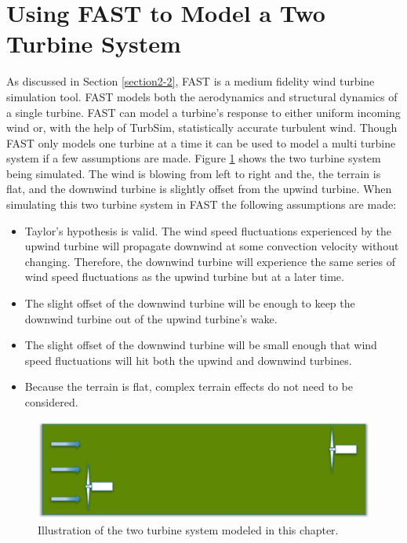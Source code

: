 
\section{Using FAST to Model a Two Turbine System} \label{section3-2}

As discussed in Section \ref{section2-2}, FAST is a medium fidelity wind turbine simulation tool. FAST models both the aerodynamics and structural dynamics of a single turbine. FAST can model a turbine's response to either uniform incoming wind or, with the help of TurbSim, statistically accurate turbulent wind. Though FAST only models one turbine at a time it can be used to model a multi turbine system if a few assumptions are made. Figure \ref{fig3-5} shows the two turbine system being simulated. The wind is blowing from left to right and the, the terrain is flat, and the downwind turbine is slightly offset from the upwind turbine. When simulating this two turbine system in FAST the following assumptions are made:

\begin{itemize}
  \item Taylor's hypothesis is valid. The wind speed fluctuations experienced by the upwind turbine will propagate downwind at some convection velocity without changing. Therefore, the downwind turbine will experience the same series of wind speed fluctuations as the upwind turbine but at a later time.
  \item The slight offset of the downwind turbine will be enough to keep the downwind turbine out of the upwind turbine's wake.
  \item The slight offset of the downwind turbine will be small enough that wind speed fluctuations will hit both the upwind and downwind turbines.
  \item Because the terrain is flat, complex terrain effects do not need to be considered.
\end{itemize}


 \begin{figure}[htbp]
	\centering
		\includegraphics[width=\linewidth]{Figures/ch3Figures/fig3-5.png}
		
	\caption{Illustration of the two turbine system modeled in this chapter.}
	\label{fig3-5}
\end{figure}

